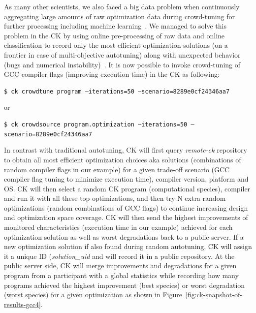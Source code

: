 As many other scientists, we also faced a big data problem when continuously 
aggregating large amounts of raw optimization data during crowd-tuning
for further processing including machine learning~\cite{new_pub_model}.
%
We managed to solve this problem in the CK by using 
online pre-processing of raw data and online classification 
to record only the most efficient optimization solutions 
(on a frontier in case of multi-objective autotuning) 
along with unexpected behavior (bugs and numerical 
instability)~\cite{cm:29db2248aba45e59:cd11e3a188574d80}.
%
It is now possible to invoke crowd-tuning of GCC compiler flags (improving execution time) in the CK as following:
\begin{flushleft}
\texttt{\$ ck crowdtune program --iterations=50 --scenario=8289e0cf24346aa7}
\end{flushleft}

or

\begin{flushleft}
\texttt{\$ ck crowdsource program.optimization --iterations=50 --scenario=8289e0cf24346aa7}
\end{flushleft}

In contrast with traditional autotuning, CK will first query \textit{remote-ck} repository
to obtain all most efficient optimization choices aka solutions (combinations of random compiler flags in our example)
for a given trade-off scenario (GCC compiler flag tuning to minimize execution time), compiler version,
platform and OS.
%
CK will then select a random CK program (computational species),
compiler and run it with all these top optimizations,
and then try N extra random optimizations (random combinations of GCC flags) 
to continue increasing design and optimization space coverage.
%
CK will then send the highest improvements of monitored characteristics 
(execution time in our example) achieved for each optimization solution as well as worst degradations
back to a public server.
%
If a new optimization solution if also found during random autotuning,
CK will assign it a unique ID (\textit{solution\_uid} 
and will record it in a public repository.
%
At the public server side, CK will merge improvements and degradations for a given
program from a participant with a global statistics while recording how many programs 
achieved the highest improvement (best species) or worst degradation (worst species) for a given optimization
as shown in Figure~\ref{fig:ck-snapshot-of-results-gcc4}.

